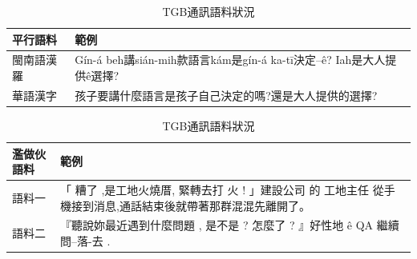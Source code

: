 \begin{table}
\caption{TGB通訊語料狀況}
\label{表：TGB通訊閩南語、華語對照}
\centering
\begin{tabular}{l|p{30em}}
平行語料 & 範例 \\
\hline
閩南語漢羅 & Gín-á beh講sián-mih款語言kám是gín-á ka-tī決定--ê? Iah是大人提供ê選擇? \\
華語漢字 & 孩子要講什麼語言是孩子自己決定的嗎?還是大人提供的選擇? \\
\hline
\end{tabular}
\begin{tabular}{l|p{30em}}
\hline
濫做伙語料 & 範例 \\
\hline
語料一 & 「 糟了 ,是工地火燒厝, 緊轉去打 火 ! 」建設公司 的 工地主任 從手機接到消息,通話結束後就帶著那群混混先離開了。 \\
語料二 & 『聽說妳最近遇到什麼問題 , 是不是 ? 怎麼了 ? 』好性地 ê QA 繼續問--落-去 . \\
\end{tabular}
\end{table}

%
%
%
%


